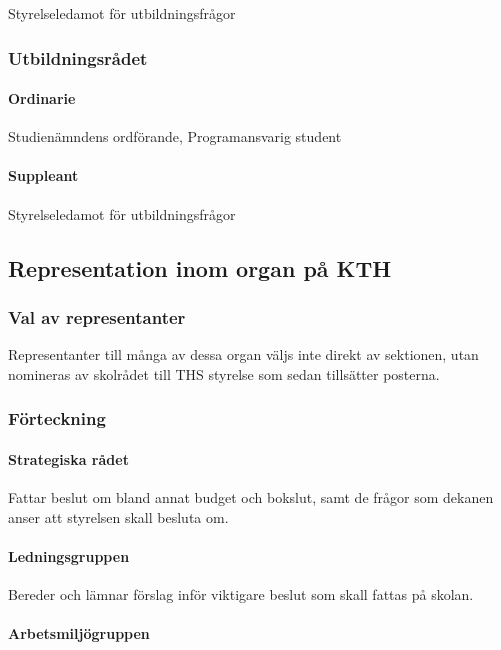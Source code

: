 \documentclass{dgovdoc}
\begin{document}
Styrelseledamot för utbildningsfrågor

\subsubsection{Utbildningsrådet}

\paragraph{Ordinarie}

Studienämndens ordförande, Programansvarig student

\paragraph{Suppleant}

Styrelseledamot för utbildningsfrågor

\subsection{Representation inom organ på KTH}

\subsubsection{Val av representanter}

Representanter till många av dessa organ väljs inte direkt av sektionen, utan
nomineras av skolrådet till THS styrelse som sedan tillsätter posterna.

\subsubsection{Förteckning}

\paragraph{Strategiska rådet}

Fattar beslut om bland annat budget och bokslut, samt de frågor som dekanen
anser att styrelsen skall besluta om.

\paragraph{Ledningsgruppen}

Bereder och lämnar förslag inför viktigare beslut som skall fattas på skolan.

\paragraph{Arbetsmiljögruppen}
\end{document}
